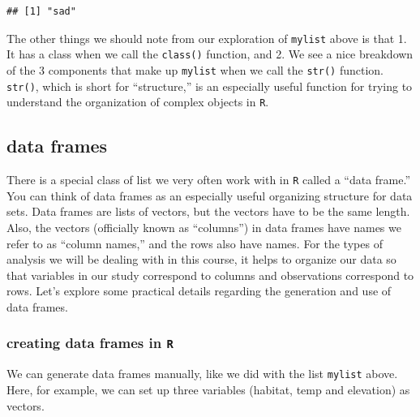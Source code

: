 \documentclass[]{book}
\begin{document}
\begin{verbatim}
## [1] "sad"
\end{verbatim}

The other things we should note from our exploration of \texttt{mylist} above is that 1. It has a class when we call the \texttt{class()} function, and 2. We see a nice breakdown of the 3 components that make up \texttt{mylist} when we call the \texttt{str()} function. \texttt{str()}, which is short for ``structure,'' is an especially useful function for trying to understand the organization of complex objects in \texttt{R}.

\hypertarget{data-frames}{%
\subsection{data frames}\label{data-frames}}

There is a special class of list we very often work with in \texttt{R} called a ``data frame.'' You can think of data frames as an especially useful organizing structure for data sets. Data frames are lists of vectors, but the vectors have to be the same length. Also, the vectors (officially known as ``columns'') in data frames have names we refer to as ``column names,'' and the rows also have names. For the types of analysis we will be dealing with in this course, it helps to organize our data so that variables in our study correspond to columns and observations correspond to rows. Let's explore some practical details regarding the generation and use of data frames.

\hypertarget{creating-data-frames-in-r}{%
\subsubsection{\texorpdfstring{creating data frames in \texttt{R}}{creating data frames in R}}\label{creating-data-frames-in-r}}

We can generate data frames manually, like we did with the list \texttt{mylist} above. Here, for example, we can set up three variables (habitat, temp and elevation) as vectors.
\end{document}
